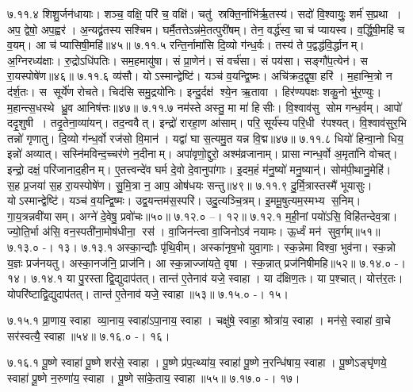 ७.११.४
शिशु॒र्जन॑धायाः। शञ्च॒ वक्षि॒ परि॑ च॒ वक्षि॑। चतु॑ स्रक्ति॒र्नाभि॑र्\mbox{}ऋ॒तस्य॑। सदो॑ वि॒श्वायुः॒ शर्म॑ स॒प्रथा। अप॒ द्वेषो॒ अप॒ह्वर॑। अ॒न्यद्व्र॑तस्य सश्चिम। घर्मै॒तत्तेऽन्न॑मे॒तत्पुरी॑षम्। तेन॒ वर्द्ध॑स्व॒ चा च॑ प्यायस्व। व॒र्द्धि॒षी॒महि॑ च व॒यम्। आ च॑ प्यासिषी॒महि॑॥४५॥
७.११.५
रन्ति॒र्नामा॑सि दि॒व्यो ग॑न्ध॒र्वः। तस्य॑ ते प॒द्वद्ध॑वि॒र्द्धानम्। अ॒ग्निरध्य॑क्षाः। रु॒द्रोऽधि॑पतिः। सम॒हमायु॑षा। सं प्रा॒णेन॑। सं वर्च॑सा। सं पय॑सा। सङ्गौ॑प॒त्येन॑। स रा॒यस्पोषे॑ण॥४६॥
७.११.६
व्य॑सौ। योऽस्मान्द्वेष्टि॑। यञ्च॑ व॒यन्द्वि॒ष्मः। अचि॑क्रद॒द्वृषा॒ हरि॑। म॒हान्मि॒त्रो न द॑र्\mbox{}श॒तः। स सूर्ये॑ण रोचते। चिद॑सि समु॒द्रयो॑निः। इन्दु॒र्दक्ष॑ श्ये॒न ऋ॒तावा। हिर॑ण्यपक्षः  शकु॒नो भु॑र॒ण्युः। म॒हान्त्स॒धस्थे ध्रु॒व आनिष॑त्तः॥४७॥
७.११.७
नम॑स्ते अस्तु॒ मा मा॑ हिसीः। वि॒श्वाव॑सु सोम गन्ध॒र्वम्। आपो॑ ददृ॒शुषी। तदृ॒तेना॒व्या॑यन्। तद॒न्ववैत्। इन्द्रो॑ रारहा॒ण आ॑साम्। परि॒ सूर्य॑स्य परि॒धी र॑पश्यत्। वि॒श्वाव॑सुर॒भि तन्नो॑ गृणातु। दि॒व्यो ग॑न्ध॒र्वो रज॑सो वि॒मान॑। यद्वा॑ घा स॒त्यमु॒त यन्न वि॒द्म॥४७॥
७.११.८
धियो॑ हिन्वा॒नो धिय॒ इन्नो॑ अव्यात्। सस्नि॑मविन्द॒च्चर॑णे न॒दीनाम्। अपा॑वृणो॒द्दुरो॒ अश्म॑व्रजानाम्। प्रासान्गन्ध॒र्वो अ॒मृता॑नि वोचत्। इन्द्रो॒ दक्षं॒ परि॑जानाद॒हीनम्। ए॒तत्त्वन्दे॑व घर्म दे॒वो दे॒वानुपा॑गाः। इ॒दम॒हं म॑नु॒ष्यो॑ मनु॒ष्यान्॑। सोम॑पी॒थानु॒मेहि॑। स॒ह प्र॒जया॑ स॒ह रा॒यस्पोषे॑ण। सु॒मि॒त्रा न॒ आप॒ ओष॑धयः सन्तु॥४९॥
७.११.९
दु॒र्मि॒त्रास्तस्मै॑ भूयासुः। योऽस्मान्द्वेष्टि॑। यञ्च॑ व॒यन्द्वि॒ष्मः। उद्व॒यन्तम॑स॒स्परि॑। उदु॒त्यञ्चि॒त्रम्। इ॒ममू॒षुत्यम॒स्मभ्य स॒निम्। गा॒य॒त्रन्नवी॑यासम्। अग्ने॑ दे॒वेषु॒ प्रवो॑चः॥५०॥
७.१२.०
--। १२॥
\anuvakamend
७.१२.१
म॒ही॒नां पयो॑ऽसि॒ विहि॑तन्देव॒त्रा। ज्यो॒ति॒र्भा अ॑सि॒ वन॒स्पती॑ना॒मोष॑धीना॒ रस॑। वा॒जिन॑न्त्वा वा॒जिनोऽव॑ नयामः। ऊ॒र्ध्वं मन॑ सुव॒र्गम्॥५१॥
७.१३.०
-। १३।
\anuvakamend
७.१३.१
अस्का॒न्द्यौः पृ॑थि॒वीम्। अस्का॑नृष॒भो युवा॒गाः। स्क॒न्नेमा विश्वा॒ भुव॑ना। स्क॒न्नो य॒ज्ञः प्रज॑नयतु। अस्का॒नज॑नि॒ प्राज॑नि। आ स्क॒न्नाज्जा॑यते॒ वृषा। स्क॒न्नात् प्रज॑निषीमहि॥५२॥
७.१४.०
-। १४।
\anuvakamend
७.१४.१
या पु॒रस्ताद्वि॒द्युदाप॑तत्। तान्त॑ ए॒तेनाव॑ यजे॒ स्वाहा। या द॑क्षिण॒तः। या प॒श्चात्। योत्त॑र॒तः। योपरि॑ष्टाद्वि॒द्युदाप॑तत्। तान्त॑ ए॒तेनाव॑ यजे॒ स्वाहा॥५३॥
७.१५.०
-। १५।
\anuvakamend

७.१५.१
प्रा॒णाय॒ स्वाहा व्या॒नाय॒ स्वाहा॑ऽपा॒नाय॒ स्वाहा। चक्षु॑षे॒ स्वाहा॒ श्रोत्रा॑य॒ स्वाहा। मन॑से॒ स्वाहा॑ वा॒चे सर॑स्वत्यै॒ स्वाहा॥५४॥
७.१६.०
-। १६।
\anuvakamend


७.१६.१
पू॒ष्णे स्वाहा॑ पू॒ष्णे शर॑से॒ स्वाहा। पू॒ष्णे प्र॑प॒त्थ्या॑य॒ स्वाहा॑ पू॒ष्णे न॒रन्धि॑षाय॒ स्वाहा। पू॒ष्णेऽङ्घृ॑णये॒ स्वाहा॑ पू॒ष्णे न॒रुणा॑य॒ स्वाहा। पू॒ष्णे सा॑के॒ताय॒ स्वाहा॥५५॥
७.१७.०
-। १७।
\anuvakamend

